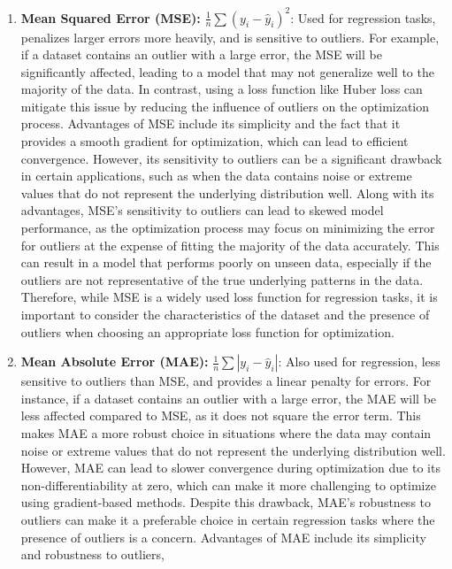 \documentclass[
  letterpaper,
  DIV=11,
  numbers=noendperiod]{scrreprt}
\begin{document}
\begin{enumerate}
\def\labelenumi{\arabic{enumi}.}
\item
  \textbf{Mean Squared Error (MSE):}
  \(\frac{1}{n} \sum (y_i - \hat{y}_i)^2\): Used for regression tasks,
  penalizes larger errors more heavily, and is sensitive to outliers.
  For example, if a dataset contains an outlier with a large error, the
  MSE will be significantly affected, leading to a model that may not
  generalize well to the majority of the data. In contrast, using a loss
  function like Huber loss can mitigate this issue by reducing the
  influence of outliers on the optimization process. Advantages of MSE
  include its simplicity and the fact that it provides a smooth gradient
  for optimization, which can lead to efficient convergence. However,
  its sensitivity to outliers can be a significant drawback in certain
  applications, such as when the data contains noise or extreme values
  that do not represent the underlying distribution well. Along with its
  advantages, MSE's sensitivity to outliers can lead to skewed model
  performance, as the optimization process may focus on minimizing the
  error for outliers at the expense of fitting the majority of the data
  accurately. This can result in a model that performs poorly on unseen
  data, especially if the outliers are not representative of the true
  underlying patterns in the data. Therefore, while MSE is a widely used
  loss function for regression tasks, it is important to consider the
  characteristics of the dataset and the presence of outliers when
  choosing an appropriate loss function for optimization.
\item
  \textbf{Mean Absolute Error (MAE):}
  \(\frac{1}{n} \sum |y_i - \hat{y}_i|\): Also used for regression, less
  sensitive to outliers than MSE, and provides a linear penalty for
  errors. For instance, if a dataset contains an outlier with a large
  error, the MAE will be less affected compared to MSE, as it does not
  square the error term. This makes MAE a more robust choice in
  situations where the data may contain noise or extreme values that do
  not represent the underlying distribution well. However, MAE can lead
  to slower convergence during optimization due to its
  non-differentiability at zero, which can make it more challenging to
  optimize using gradient-based methods. Despite this drawback, MAE's
  robustness to outliers can make it a preferable choice in certain
  regression tasks where the presence of outliers is a concern.
  Advantages of MAE include its simplicity and robustness to outliers,

\end{enumerate}
\end{document}
